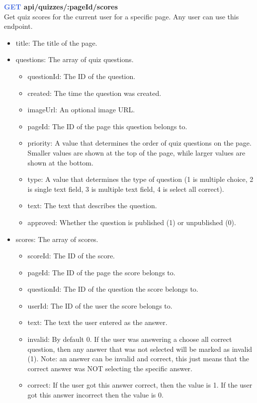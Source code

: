 \documentclass[onecolumn, draftclsnofoot,10pt, compsoc, usenames, dvipsnames]{IEEEtran}
\begin{document}
\noindent
\textbf{\textcolor{RoyalBlue}{GET} api/quizzes/:pageId/scores} \\
Get quiz scores for the current user for a specific page. Any user can use this endpoint.
\begin{itemize}
    \item title: The title of the page.
    \item questions: The array of quiz questions.
    \begin{itemize}
        \item questionId: The ID of the question.
        \item created: The time the question was created.
        \item imageUrl: An optional image URL.
        \item pageId: The ID of the page this question belongs to.
        \item priority: A value that determines the order of quiz questions on the page. Smaller values are shown at the top of the page, while larger values are shown at the bottom.
        \item type: A value that determines the type of question (1 is multiple choice, 2 is single text field, 3 is multiple text field, 4 is select all correct).
        \item text: The text that describes the question.
        \item approved: Whether the question is published (1) or unpublished (0).
    \end{itemize}
    \item scores: The array of scores.
    \begin{itemize}
        \item scoreId: The ID of the score.
        \item pageId: The ID of the page the score belongs to.
        \item questionId: The ID of the question the score belongs to.
        \item userId: The ID of the user the score belongs to.
        \item text: The text the user entered as the answer.
        \item invalid: By default 0. If the user was answering a choose all correct question, then any answer that was not selected will be marked as invalid (1). Note: an answer can be invalid and correct, this just means that the correct answer was NOT selecting the specific answer.
        \item correct: If the user got this answer correct, then the value is 1. If the user got this answer incorrect then the value is 0.
    \end{itemize}
\end{itemize}
\end{document}
